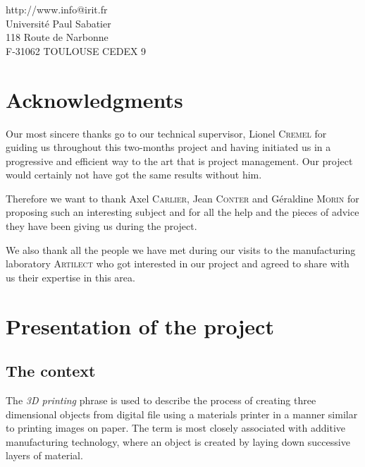 \documentclass{report}
\begin{document}
\begin{center}
http://www.info@irit.fr\\
Université Paul Sabatier \\
118 Route de Narbonne \\
F-31062 TOULOUSE CEDEX 9
\end{center}

\thispagestyle{empty}

\newpage

\chapter*{Acknowledgments}

	Our most sincere thanks go to our technical supervisor, Lionel \textsc{Cremel} for guiding us throughout this two-months project and having initiated us in a progressive and efficient way to the art that is project management. Our project would certainly not have got the same results without him.\\

\bigskip

	Therefore we want to thank Axel \textsc{Carlier}, Jean \textsc{Conter} and Géraldine \textsc{Morin} for proposing such an interesting subject and for all the help and the pieces of advice they have been giving us during the project.\\

\bigskip

	We also thank all the people we have met during our visits to the manufacturing laboratory \textsc{Artilect} who got interested in our project and agreed to share with us their expertise in this area.

\tableofcontents

\chapter{Presentation of the project}

\section{The context}

	The \textit{3D printing} phrase is used to describe the process of creating three dimensional objects from digital file using a materials printer in a manner similar to printing images on paper. The term is most closely associated with additive manufacturing technology, where an object is created by laying down successive layers of material.\\
\end{document}
